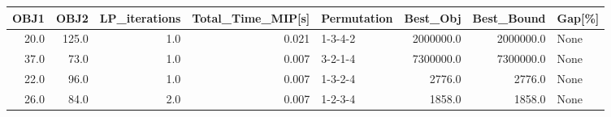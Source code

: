 \begin{tabular}{rrrrlrrl}
\toprule
 OBJ1 &   OBJ2 &  LP\_iterations &  Total\_Time\_MIP[s] & Permutation &   Best\_Obj &  Best\_Bound & Gap[\%] \\
\midrule
 20.0 &  125.0 &            1.0 &              0.021 &     1-3-4-2 &  2000000.0 &   2000000.0 &   None \\
 37.0 &   73.0 &            1.0 &              0.007 &     3-2-1-4 &  7300000.0 &   7300000.0 &   None \\
 22.0 &   96.0 &            1.0 &              0.007 &     1-3-2-4 &     2776.0 &      2776.0 &   None \\
 26.0 &   84.0 &            2.0 &              0.007 &     1-2-3-4 &     1858.0 &      1858.0 &   None \\
\bottomrule
\end{tabular}
